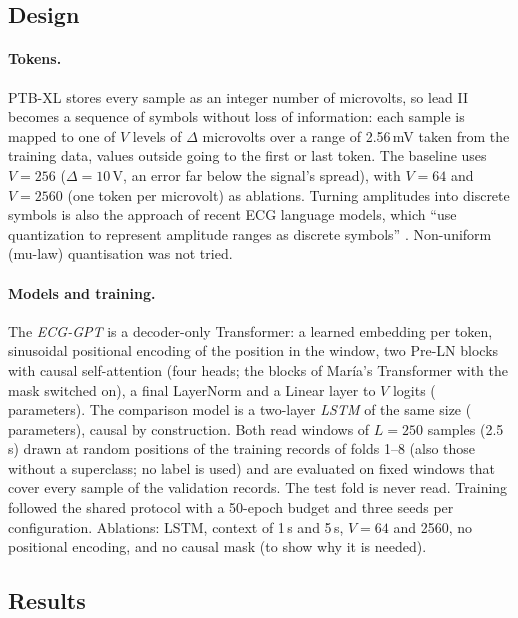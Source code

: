 \subsection{Design}

\paragraph{Tokens.} PTB-XL stores every sample as an integer number of microvolts, so lead II becomes a
sequence of symbols without loss of information: each sample is mapped to one of $V$ levels of $\Delta$
microvolts over a range of 2.56\,mV taken from the training data, values outside going to the first or
last token. The baseline uses $V = 256$ ($\Delta = 10$\,\textmu V, an error far below the signal's
spread), with $V = 64$ and $V = 2560$ (one token per microvolt) as ablations. Turning amplitudes into
discrete symbols is also the approach of recent ECG language models, which ``use quantization to
represent amplitude ranges as discrete symbols'' \cite[p.~2]{han2025ecgbyte}. Non-uniform (mu-law)
quantisation was not tried.

\paragraph{Models and training.} The \emph{ECG-GPT} is a decoder-only Transformer: a learned embedding
per token, sinusoidal positional encoding of the position in the window, two Pre-LN blocks with causal
self-attention (four heads; the blocks of Mar\'ia's Transformer with the mask switched on), a final
LayerNorm and a Linear layer to $V$ logits (\generativeParamsBase{} parameters). The comparison model is
a two-layer \emph{LSTM} of the same size (\generativeParamsLstm{} parameters), causal by construction.
Both read windows of $L = 250$ samples (2.5\,s) drawn at random positions of the training records of
folds 1--8 (also those without a superclass; no label is used) and are evaluated on fixed windows that
cover every sample of the validation records. The test fold is never read. Training followed the shared
protocol with a 50-epoch budget and three seeds per configuration. Ablations: LSTM, context of 1\,s and
5\,s, $V = 64$ and 2560, no positional encoding, and no causal mask (to show why it is needed).

\subsection{Results}

